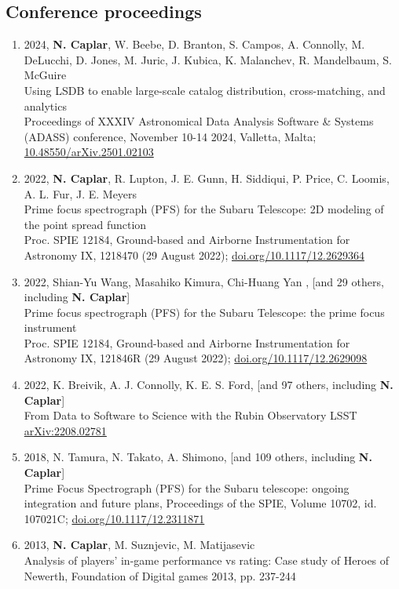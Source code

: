 \documentclass[11pt,letterpaper]{article}
\begin{document}
\subsection*{Conference proceedings}
\begin{enumerate}

\item 2024, \textbf{N. Caplar}, W. Beebe, D. Branton, S. Campos, A. Connolly, M. DeLucchi, D. Jones, M. Juric, J. Kubica, K. Malanchev, R. Mandelbaum, S. McGuire\\
Using LSDB to enable large-scale catalog distribution, cross-matching, and analytics\\
 Proceedings of XXXIV Astronomical Data Analysis Software \& Systems (ADASS) conference, November 10-14 2024, Valletta, Malta;  \href{https://ui.adsabs.harvard.edu/link_gateway/2025arXiv250102103C/doi:10.48550/arXiv.2501.02103}{10.48550/arXiv.2501.02103}

\item 2022, \textbf{N. Caplar}, R. Lupton, J. E. Gunn, H. Siddiqui, P. Price, C. Loomis, A. L. Fur, J. E. Meyers\\
Prime focus spectrograph (PFS) for the Subaru Telescope: 2D modeling of the point spread function\\
Proc. SPIE 12184, Ground-based and Airborne Instrumentation for Astronomy IX, 1218470 (29 August 2022);  \href{https://doi.org/10.1117/12.2629364}{doi.org/10.1117/12.2629364}

\item 2022, Shian-Yu Wang, Masahiko Kimura, Chi-Huang Yan , [and 29 others, including \textbf{N. Caplar}] \\
Prime focus spectrograph (PFS) for the Subaru Telescope: the prime focus instrument \\ 
Proc. SPIE 12184, Ground-based and Airborne Instrumentation for Astronomy IX, 121846R (29 August 2022);  \href{https://doi.org/10.1117/12.2629098}{doi.org/10.1117/12.2629098}

\item 2022, K. Breivik, A. J. Connolly, K. E. S. Ford, [and 97 others, including \textbf{N. Caplar}]   \\
From Data to Software to Science with the Rubin Observatory LSST \\
\href{https://arxiv.org/abs/2208.02781}{arXiv:2208.02781} 

\item 2018, N. Tamura, N. Takato, A. Shimono, [and 109 others, including \textbf{N. Caplar}] \\ Prime Focus Spectrograph (PFS) for the Subaru telescope: ongoing integration and future plans, Proceedings of the SPIE, Volume 10702, id. 107021C; \href{https://doi.org/10.1117/12.2311871}{doi.org/10.1117/12.2311871}

\item 2013,  \textbf{N. Caplar}, M. Suznjevic, M. Matijasevic  \\ Analysis of players' in-game performance vs rating: Case study of Heroes of Newerth, Foundation of Digital games 2013,  pp. 237-244  

\end{enumerate}

\newpage 
\end{document}
